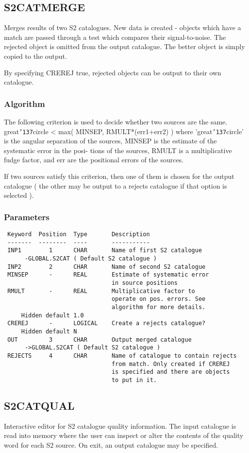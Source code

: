 \documentclass{book}
\renewcommand{\_}{{\tt\char'137}}     %
\begin{document}
\subsection{S2CATMERGE}
Merges results of two S2 catalogues. New data is created -
objects which have a match are passed through a test which
compares their signal-to-noise. The rejected object is
omitted from the output catalogue. The better object is
simply copied to the output.

By specifying CREREJ true, rejected objects can be output
to their own catalogue.

\subsubsection{Algorithm}
The following criterion is used to decide whether two sources
are the same.
great\_circle < max( MINSEP, RMULT*(err1+err2) )
where 'great\_circle' is the angular separation of the sources,
MINSEP is the estimate of the systematic error in the posi-
tions of the sources, RMULT is a multiplicative fudge factor,
and err are the positional errors of the sources.

If two sources satisfy this criterion, then one of them is
chosen for the output catalogue ( the other may be output
to a rejects catalogue if that option is selected ).

\subsubsection{Parameters}
\begin{verbatim}
 Keyword  Position  Type       Description
 -------  --------  ----       -----------
 INP1        1      CHAR       Name of first S2 catalogue
      -GLOBAL.S2CAT ( Default S2 catalogue )
 INP2        2      CHAR       Name of second S2 catalogue
 MINSEP      -      REAL       Estimate of systematic error
                               in source positions
 RMULT       -      REAL       Multiplicative factor to
                               operate on pos. errors. See
                               algorithm for more details.
     Hidden default 1.0
 CREREJ      -      LOGICAL    Create a rejects catalogue?
     Hidden default N
 OUT         3      CHAR       Output merged catalogue
      ->GLOBAL.S2CAT ( Default S2 catalogue )
 REJECTS     4      CHAR       Name of catalogue to contain rejects
                               from match. Only created if CREREJ
                               is specified and there are objects
                               to put in it.

\end{verbatim}\subsection{S2CATQUAL}
Interactive editor for S2 catalogue quality information. The input
catalogue is read into memory where the user can inspect or alter
the contents of the quality word for each S2 source. On exit, an
output catalogue may be specified.
\end{document}
